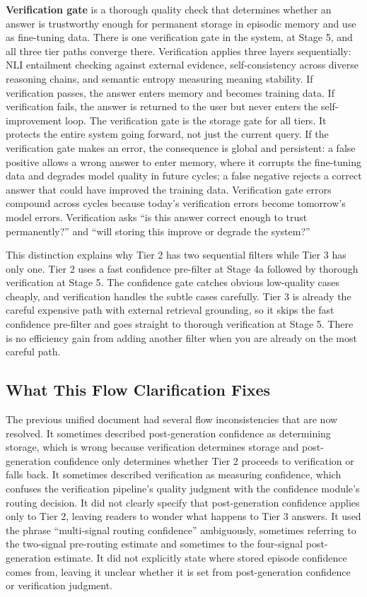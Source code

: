 \documentclass[11pt,a4paper]{article}
\begin{document}
\textbf{Verification gate} is a thorough quality check that determines whether an answer is trustworthy enough for permanent storage in episodic memory and use as fine-tuning data. There is one verification gate in the system, at Stage 5, and all three tier paths converge there. Verification applies three layers sequentially: NLI entailment checking against external evidence, self-consistency across diverse reasoning chains, and semantic entropy measuring meaning stability. If verification passes, the answer enters memory and becomes training data. If verification fails, the answer is returned to the user but never enters the self-improvement loop. The verification gate is the storage gate for all tiers. It protects the entire system going forward, not just the current query. If the verification gate makes an error, the consequence is global and persistent: a false positive allows a wrong answer to enter memory, where it corrupts the fine-tuning data and degrades model quality in future cycles; a false negative rejects a correct answer that could have improved the training data. Verification gate errors compound across cycles because today's verification errors become tomorrow's model errors. Verification asks ``is this answer correct enough to trust permanently?'' and ``will storing this improve or degrade the system?''

This distinction explains why Tier 2 has two sequential filters while Tier 3 has only one. Tier 2 uses a fast confidence pre-filter at Stage 4a followed by thorough verification at Stage 5. The confidence gate catches obvious low-quality cases cheaply, and verification handles the subtle cases carefully. Tier 3 is already the careful expensive path with external retrieval grounding, so it skips the fast confidence pre-filter and goes straight to thorough verification at Stage 5. There is no efficiency gain from adding another filter when you are already on the most careful path.

\subsection{What This Flow Clarification Fixes}

The previous unified document had several flow inconsistencies that are now resolved. It sometimes described post-generation confidence as determining storage, which is wrong because verification determines storage and post-generation confidence only determines whether Tier 2 proceeds to verification or falls back. It sometimes described verification as measuring confidence, which confuses the verification pipeline's quality judgment with the confidence module's routing decision. It did not clearly specify that post-generation confidence applies only to Tier 2, leaving readers to wonder what happens to Tier 3 answers. It used the phrase ``multi-signal routing confidence'' ambiguously, sometimes referring to the two-signal pre-routing estimate and sometimes to the four-signal post-generation estimate. It did not explicitly state where stored episode confidence comes from, leaving it unclear whether it is set from post-generation confidence or verification judgment.
\end{document}

